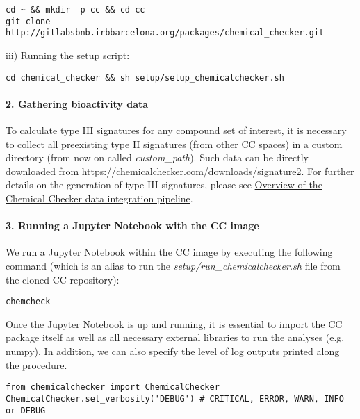 \begin{lstlisting}
cd ~ && mkdir -p cc && cd cc
git clone http://gitlabsbnb.irbbarcelona.org/packages/chemical_checker.git
\end{lstlisting}

iii) Running the setup script:  \\

\begin{lstlisting}
cd chemical_checker && sh setup/setup_chemicalchecker.sh
\end{lstlisting}


\paragraph{2. Gathering bioactivity data} \leavevmode

To calculate type III signatures for any compound set of interest, it is necessary to collect all preexisting type II signatures (from other CC spaces) in a custom directory (from now on called \textit{custom\_path}). Such data can be directly downloaded from \href{https://chemicalchecker.com/downloads/signature2}{https://chemicalchecker.com/downloads/signature2}. For further details on the generation of type III signatures, please see \hyperref[Overview of the Chemical Checker data integration pipeline]{Overview of the Chemical Checker data integration pipeline}.


\paragraph{3. Running a Jupyter Notebook with the CC image} \leavevmode

We run a Jupyter Notebook within the CC image by executing the following command (which is an alias to run the \textit{setup/run\_chemicalchecker.sh} file from the cloned CC repository): \\

\begin{lstlisting}
chemcheck
\end{lstlisting}

Once the Jupyter Notebook is up and running, it is essential to import the CC package itself as well as all necessary external libraries to run the analyses (e.g. numpy). In addition, we can also specify the level of log outputs printed along the procedure. \\

\begin{lstlisting}
from chemicalchecker import ChemicalChecker
ChemicalChecker.set_verbosity('DEBUG') # CRITICAL, ERROR, WARN, INFO or DEBUG
\end{lstlisting}


